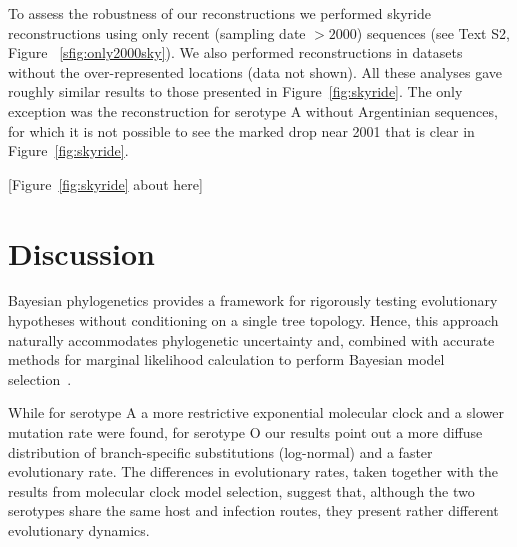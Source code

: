 \documentclass[10pt]{article}
\begin{document}
To assess the robustness of our reconstructions we performed skyride reconstructions using only recent (sampling date $>2000$) sequences (see Text S2, Figure ~\ref{sfig:only2000sky}).
We also performed reconstructions in datasets without the over-represented locations (data not shown). All these analyses gave roughly similar results to those presented in Figure~\ref{fig:skyride}. The only exception was the reconstruction for serotype A without Argentinian sequences, for which it is not possible to see the marked drop near 2001 that is clear in Figure~\ref{fig:skyride}. 

\begin{center}
 [Figure~\ref{fig:skyride} about here]
\end{center}

\section*{Discussion}
Bayesian phylogenetics provides a framework for rigorously testing evolutionary hypotheses without conditioning on a single tree topology. Hence, this approach naturally accommodates phylogenetic uncertainty and, combined with accurate methods for marginal likelihood calculation to perform Bayesian model selection~\cite{Baele2012,Baele2013a,Baele2013b}.

While for serotype A a more restrictive exponential molecular clock and a slower mutation rate were found, for serotype O our results point out a more diffuse distribution of branch-specific substitutions (log-normal) and a faster evolutionary rate.
The differences in evolutionary rates, taken together with the results from molecular clock model selection, suggest that, although the two serotypes share the same host and infection routes, they present rather different evolutionary dynamics. 
\end{document}
